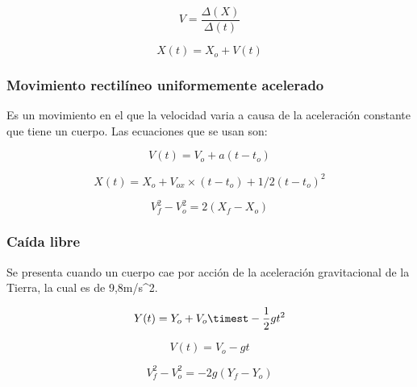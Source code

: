 \documentclass{article}
\begin{document}
\begin{equation}
V=\dfrac{ \Delta(X)}{\Delta(t)}
\end{equation}

\begin{equation}
X(t)= X_{o} +V(t) 
\end{equation}

\subsubsection{Movimiento rectilíneo uniformemente acelerado}
Es un movimiento en el que la velocidad varia a causa de la aceleraci\'on constante que tiene un cuerpo.
Las ecuaciones que se usan son:

\begin{equation}
V(t)= V_{o} + a(t-t_{o}) 
\end{equation}

\begin{equation}
X(t)= X_{o} + V_{ox}\times(t-t_{o}) +1/2(t-t_{o})^{2} 
\end{equation}

\begin{equation}
V_{f}^{2} - V_{o}^{2}= 2(X_{f}-X_{o})
\end{equation}

\subsubsection{Ca\'ida libre}
Se presenta cuando un cuerpo cae por acci\'on de la aceleraci\'on gravitacional de la Tierra, la cual es de 9,8m/s^{2}.

\begin{equation}
Y(t)= Y_{o} +V_{o}\timest -\dfrac{1}{2}gt^{2}
\end{equation}

\begin{equation}
V(t)= V_{o}  -gt
\end{equation}

\begin{equation}
V_{f}^{2}-V_{o}^{2}= -2g(Y_{f}-Y_{o})
\end{equation}
\end{document}
